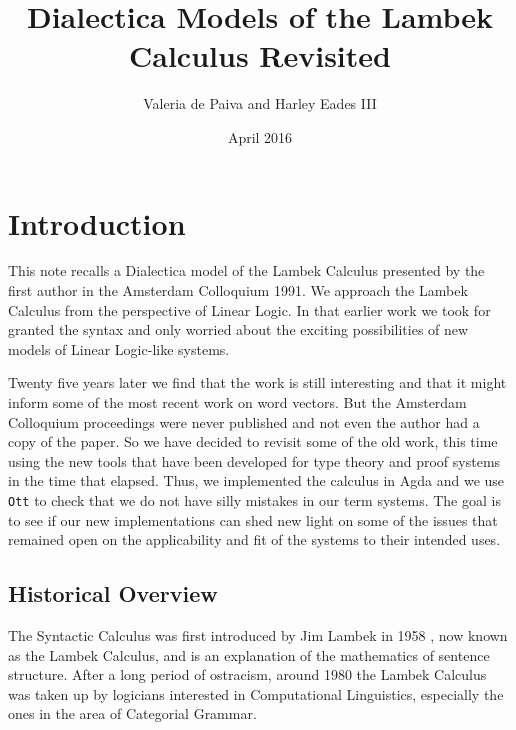 \documentclass{article}
\title{Dialectica Models of the Lambek Calculus Revisited}
\author{Valeria de Paiva and Harley Eades III}
\date{April 2016}
\begin{document}
\maketitle

\section*{Introduction}

This note recalls a Dialectica model of the Lambek Calculus presented
by the first author in the Amsterdam Colloquium 1991. We approach the
Lambek Calculus from the perspective of Linear Logic. In that earlier
work we took for granted the syntax and only worried about the
exciting possibilities of new models of Linear Logic-like systems.

Twenty five years later we find that the work is still interesting and
that it might inform some of the most recent work on word vectors. But
the Amsterdam Colloquium proceedings were never published and not even
the author had a copy of the paper. So we have decided to revisit some
of the old work, this time using the new tools that have been
developed for type theory and proof systems in the time that
elapsed. Thus, we implemented the calculus in Agda and we use
\texttt{Ott} \cite{Sewell:2010} to check that we do not have silly
mistakes in our term systems. The goal is to see if our new
implementations can shed new light on some of the issues that remained
open on the applicability and fit of the systems to their intended
uses.

\subsection*{Historical Overview}
The Syntactic Calculus was first introduced by Jim Lambek in 1958
\cite{Lambek1958}, now known as the Lambek Calculus, and is an
explanation of the mathematics of sentence structure.  After a long
period of ostracism, around 1980 the Lambek Calculus was taken up by
logicians interested in Computational Linguistics, especially the ones
in the area of Categorial Grammar.
\end{document}
